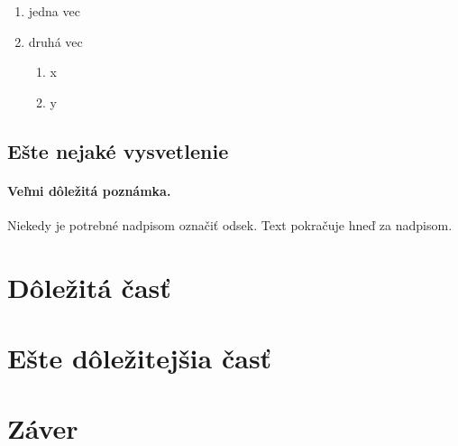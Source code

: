 \documentclass[10pt,twoside,english,a4paper]{article}
\begin{document}
\begin{enumerate}
\item jedna vec
\item druhá vec
	\begin{enumerate}
	\item x
	\item y
	\end{enumerate}
\end{enumerate}


\subsection{Ešte nejaké vysvetlenie} \label{ina:este}

\paragraph{Veľmi dôležitá poznámka.}
Niekedy je potrebné nadpisom označiť odsek. Text pokračuje hneď za nadpisom.



\section{Dôležitá časť} \label{dolezita}




\section{Ešte dôležitejšia časť} \label{dolezitejsia}




\section{Záver} \label{zaver} %







\end{document}
